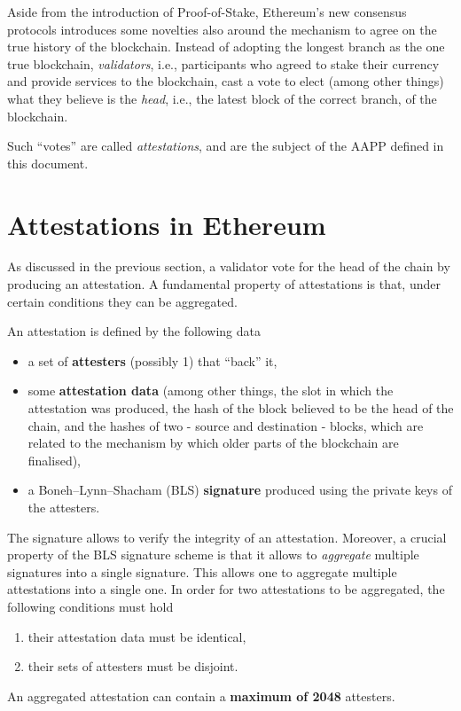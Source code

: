 \documentclass{article}
\begin{document}
Aside from the introduction of Proof-of-Stake, Ethereum's new consensus
protocols introduces some novelties also around the mechanism to agree on the
true history of the blockchain. Instead of adopting the longest branch as the
one true blockchain, \emph{validators}, i.e., participants who agreed to stake
their currency and provide services to the blockchain, cast a vote to elect
(among other things) what they believe is the \emph{head}, i.e., the latest
block of the correct branch, of the blockchain.

Such ``votes'' are called \emph{attestations}, and are the subject of the AAPP
defined in this document.

\section{Attestations in Ethereum}

As discussed in the previous section, a validator vote for the head of the 
chain by producing an attestation. A fundamental property of attestations is
that, under certain conditions they can be aggregated.

An attestation is defined by the following data
%
\begin{itemize}
  \item a set of \textbf{attesters} (possibly 1) that ``back'' it, 
  \item some \textbf{attestation data} (among other things, the slot in which
  the attestation was produced, the hash of the block believed to be the head
  of the chain, and the hashes of two - source and destination - blocks, which
  are related to the mechanism by which older parts of the blockchain are
  finalised), 
  \item a Boneh–Lynn–Shacham (BLS) \textbf{signature} produced using the
  private keys of the attesters.  
\end{itemize}
%
The signature allows to verify the integrity of an attestation. Moreover, a
crucial property of the BLS signature scheme is that it allows to
\emph{aggregate} multiple signatures into a single signature. This allows one
to aggregate multiple attestations into a single one. In order for two
attestations to be aggregated, the following conditions must hold
%
\begin{enumerate} 
  \item their attestation data must be identical, 
  \item their sets of attesters must be disjoint.
\end{enumerate}
%
An aggregated attestation can contain a \textbf{maximum of 2048} attesters.
\end{document}
